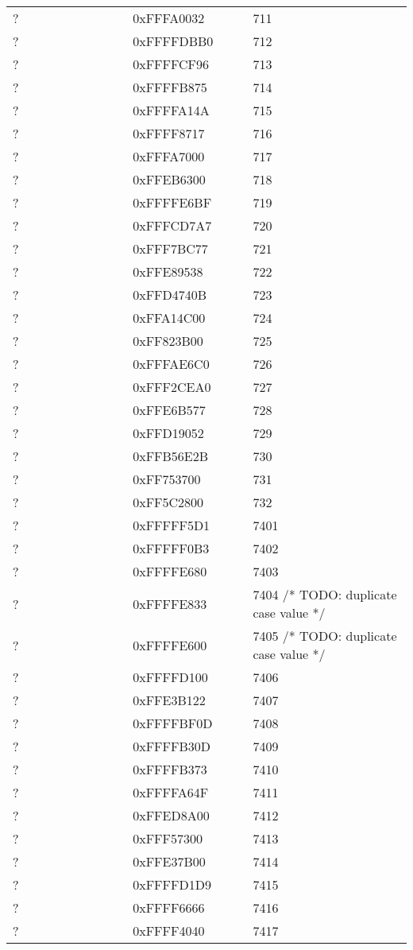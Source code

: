 \begin{longtable}{p{0.3\linewidth} p{0.3\linewidth} p{0.4\linewidth}}
? &  0xFFFA0032 &  711\\
? &  0xFFFFDBB0 &  712\\
? &  0xFFFFCF96 &  713\\
? &  0xFFFFB875 &  714\\
? &  0xFFFFA14A &  715\\
? &  0xFFFF8717 &  716\\
? &  0xFFFA7000 &  717\\
? &  0xFFEB6300 &  718\\
? &  0xFFFFE6BF &  719\\
? &  0xFFFCD7A7 &  720\\
? &  0xFFF7BC77 &  721\\
? &  0xFFE89538 &  722\\
? &  0xFFD4740B &  723\\
? &  0xFFA14C00 &  724\\
? &  0xFF823B00 &  725\\
? &  0xFFFAE6C0 &  726\\
? &  0xFFF2CEA0 &  727\\
? &  0xFFE6B577 &  728\\
? &  0xFFD19052 &  729\\
? &  0xFFB56E2B &  730\\
? &  0xFF753700 &  731\\
? &  0xFF5C2800 &  732\\
? &  0xFFFFF5D1 &  7401\\
? &  0xFFFFF0B3 &  7402\\
? &  0xFFFFE680 &  7403\\
? &  0xFFFFE833 &  7404 /* TODO: duplicate case value */\\
? &  0xFFFFE600 &  7405 /* TODO: duplicate case value */\\
? &  0xFFFFD100 &  7406\\
? &  0xFFE3B122 &  7407\\
? &  0xFFFFBF0D &  7408\\
? &  0xFFFFB30D &  7409\\
? &  0xFFFFB373 &  7410\\
? &  0xFFFFA64F &  7411\\
? &  0xFFED8A00 &  7412\\
? &  0xFFF57300 &  7413\\
? &  0xFFE37B00 &  7414\\
? &  0xFFFFD1D9 &  7415\\
? &  0xFFFF6666 &  7416\\
? &  0xFFFF4040 &  7417\\

\end{longtable}
